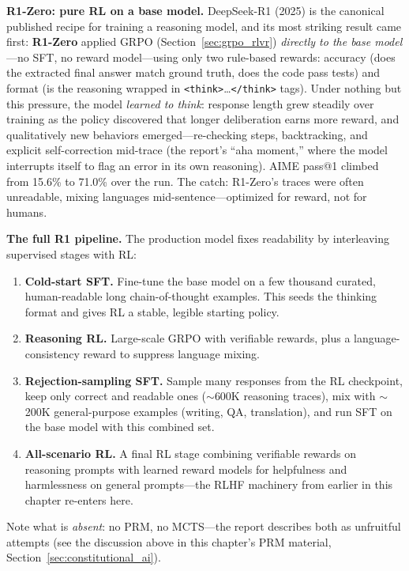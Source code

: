 \textbf{R1-Zero: pure RL on a base model.} DeepSeek-R1 (2025) is the canonical published recipe for training a reasoning model, and its most striking result came first: \textbf{R1-Zero} applied GRPO (Section~\ref{sec:grpo_rlvr}) \textit{directly to the base model}---no SFT, no reward model---using only two rule-based rewards: accuracy (does the extracted final answer match ground truth, does the code pass tests) and format (is the reasoning wrapped in \texttt{<think>}\ldots\texttt{</think>} tags). Under nothing but this pressure, the model \textit{learned to think}: response length grew steadily over training as the policy discovered that longer deliberation earns more reward, and qualitatively new behaviors emerged---re-checking steps, backtracking, and explicit self-correction mid-trace (the report's ``aha moment,'' where the model interrupts itself to flag an error in its own reasoning). AIME pass@1 climbed from 15.6\% to 71.0\% over the run. The catch: R1-Zero's traces were often unreadable, mixing languages mid-sentence---optimized for reward, not for humans.

\textbf{The full R1 pipeline.} The production model fixes readability by interleaving supervised stages with RL:
\begin{enumerate}
    \item \textbf{Cold-start SFT.} Fine-tune the base model on a few thousand curated, human-readable long chain-of-thought examples. This seeds the thinking format and gives RL a stable, legible starting policy.
    \item \textbf{Reasoning RL.} Large-scale GRPO with verifiable rewards, plus a language-consistency reward to suppress language mixing.
    \item \textbf{Rejection-sampling SFT.} Sample many responses from the RL checkpoint, keep only correct and readable ones ($\sim$600K reasoning traces), mix with $\sim$200K general-purpose examples (writing, QA, translation), and run SFT on the base model with this combined set.
    \item \textbf{All-scenario RL.} A final RL stage combining verifiable rewards on reasoning prompts with learned reward models for helpfulness and harmlessness on general prompts---the RLHF machinery from earlier in this chapter re-enters here.
\end{enumerate}
Note what is \textit{absent}: no PRM, no MCTS---the report describes both as unfruitful attempts (see the discussion above in this chapter's PRM material, Section~\ref{sec:constitutional_ai}).

